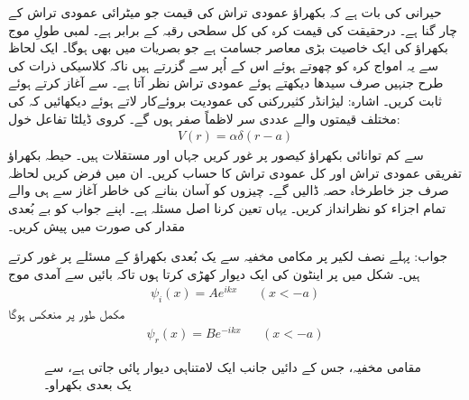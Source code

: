 حیرانی کی بات ہے کہ بکھراؤ عمودی تراش کی قیمت جو میٹرائی عمودی تراش کے چار گنا ہے۔ درحقیقت  کی قیمت کرہ کی کل سطحی رقبہ کے برابر ہے۔ لمبی طولِ موج بکھراؤ کی ایک خاصیت بڑی معاصر جسامت ہے جو بصریات میں بھی ہوگا۔ ایک لحاظ سے یہ امواج کرہ کو چھوتے ہوئے اس کے اُپر سے گزرتے ہیں ناکہ کلاسیکی ذرات کی طرح جنہیں صرف سیدھا دیکھتے ہوئے عمودی تراش نظر آتا ہے۔
 سے آغاز کرتے ہوئے  ثابت کریں۔ اشارہ: لیژانڈر کثیررکنی کی عمودیت بروئےکار لاتے ہوئے دیکھائیں کہ  کی مختلف قیمتوں والے عددی سر لاظماً صفر ہوں گے۔
کروی ڈیلٹا تفاعل خول:
\begin{align*}
	V(r) = \alpha\delta(r-a)
\end{align*}
سے کم توانائی بکھراؤ کیصور پر غور کریں جہاں  اور  مستقلات ہیں۔ حیطہ بکھراؤ  تفریقی عمودی تراش  اور کل عمودی تراش  کا حساب کریں۔ ان میں  فرض کریں لحاظہ صرف  جز خاطرخاہ حصہ ڈالیں گے۔ چیزوں کو آسان بنانے کی خاطر آغاز سے ہی  والے تمام اجزاء کو نظرانداز کریں۔ یہاں  تعین کرنا اصل مسئلہ ہے۔ اپنے جواب کو بے بُعدی مقدار  کی صورت میں پیش کریں۔

جواب: 	
پہلے نصف لکیر  پر مکامی مخفیہ  سے یک بُعدی بکھراؤ کے مسئلے پر غور کرتے ہیں۔ شکل   میں  پر اینٹون کی ایک دیوار کھڑی کرتا ہوں تاکہ بائیں سے آمدی موج 
\begin{align}
	\psi_i(x) = Ae^{ikx}&&(x<-a)
\end{align}
مکمل طور پر منعکس ہوگا
\begin{align}
	\psi_r(x) = Be^{-ikx}&&(x<-a)
\end{align}
%
\begin{figure}
\centering
{}
\caption{مقامی مخفیہ، جس کے  دائیں جانب ایک   لامتناہی دیوار  پائی جاتی ہے، سے یک بعدی بکھراو۔}
\label{شکل_بکھراو_یک_بعدی_مقامی_مخفیہ}
\end{figure}

